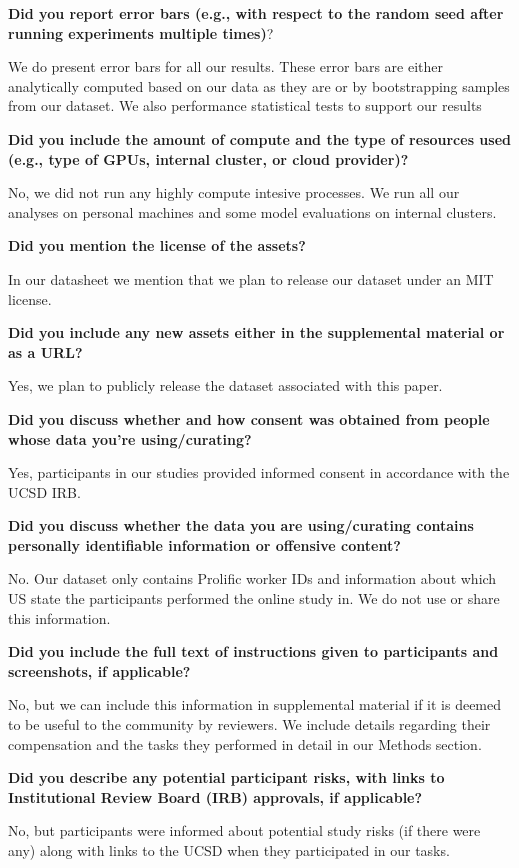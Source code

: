 \documentclass{article}
\begin{document}
\textbf{Did you report error bars (e.g., with respect to the random seed after running experiments multiple times)}?

We do present error bars for all our results. These error bars are either analytically computed based on our data as they are or by bootstrapping samples from our dataset. 
We also performance statistical tests to support our results

\textbf{
Did you include the amount of compute and the type of resources used (e.g., type of GPUs, internal cluster, or cloud provider)?}

No, we did not run any highly compute intesive processes. We run all our analyses on personal machines and some model evaluations on internal clusters.

\textbf{ Did you mention the license of the assets?}

In our datasheet we mention that we plan to release our dataset under an MIT license.

\textbf{Did you include any new assets either in the supplemental material or as a URL?}

Yes, we plan to publicly release the dataset associated with this paper.

\textbf{ Did you discuss whether and how consent was obtained from people whose data you're using/curating?}

Yes, participants in our studies provided informed consent in accordance with the UCSD IRB.

\textbf{Did you discuss whether the data you are using/curating contains personally identifiable information or offensive content?}

No. Our dataset only contains Prolific worker IDs and information about which US state the participants performed the online study in. 
We do not use or share this information.

\textbf{Did you include the full text of instructions given to participants and screenshots, if applicable?}

No, but we can include this information in supplemental material if it is deemed to be useful to the community by reviewers.
We include details regarding their compensation and the tasks they performed in detail in our Methods section.

\textbf{ Did you describe any potential participant risks, with links to Institutional Review Board (IRB) approvals, if applicable?}

No, but participants were informed about potential study risks (if there were any) along with links to the UCSD when they participated in our tasks.
\end{document}
